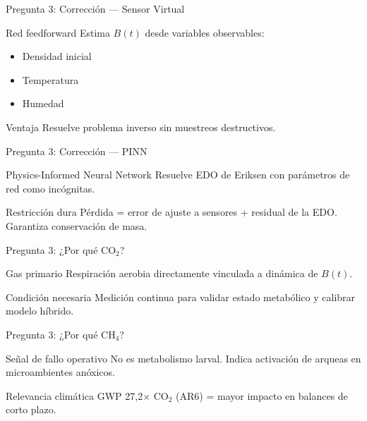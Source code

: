 \documentclass[aspectratio=169, 11pt]{beamer}
\begin{document}
\begin{frame}{Pregunta 3: Corrección --- Sensor Virtual}
\begin{exampleblock}{Red feedforward}
\footnotesize
Estima $B(t)$ desde variables observables:
\begin{itemize}
    \item Densidad inicial
    \item Temperatura
    \item Humedad
\end{itemize}
\end{exampleblock}
\begin{block}{Ventaja}
\footnotesize
Resuelve problema inverso sin muestreos destructivos.
\end{block}
\end{frame}

\begin{frame}{Pregunta 3: Corrección --- PINN}
\begin{block}{Physics-Informed Neural Network}
\footnotesize
Resuelve EDO de Eriksen con parámetros de red como incógnitas.
\end{block}
\begin{exampleblock}{Restricción dura}
\footnotesize
Pérdida = error de ajuste a sensores + residual de la EDO. Garantiza conservación de masa.
\end{exampleblock}
\end{frame}

\begin{frame}{Pregunta 3: ¿Por qué CO$_2$?}
\begin{block}{Gas primario}
\footnotesize
Respiración aerobia directamente vinculada a dinámica de $B(t)$.
\end{block}
\begin{exampleblock}{Condición necesaria}
\footnotesize
Medición continua para validar estado metabólico y calibrar modelo híbrido.
\end{exampleblock}
\end{frame}

\begin{frame}{Pregunta 3: ¿Por qué CH$_4$?}
\begin{alertblock}{Señal de fallo operativo}
\footnotesize
No es metabolismo larval. Indica activación de arqueas en microambientes anóxicos.
\end{alertblock}
\begin{block}{Relevancia climática}
\footnotesize
GWP 27,2$\times$ CO$_2$ (AR6) = mayor impacto en balances de corto plazo.
\end{block}
\end{frame}
\end{document}
